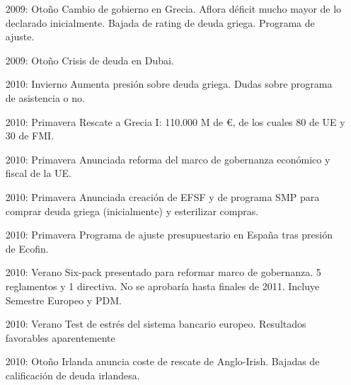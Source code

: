 \documentclass{nuevotema}
\begin{document}
\begin{itemize}
	\item[2009: Otoño] Cambio de gobierno en Grecia. Aflora déficit mucho mayor de lo declarado inicialmente. Bajada de rating de deuda griega. Programa de ajuste.
	\item[2009: Otoño] Crisis de deuda en Dubai.
	\item[2010: Invierno] Aumenta presión sobre deuda griega. Dudas sobre programa de asistencia o no.
	\item[2010: Primavera] Rescate a Grecia I: 110.000 M de €, de los cuales 80 de UE y 30 de FMI.
	\item[2010: Primavera] Anunciada reforma del marco de gobernanza económico y fiscal de la UE.
	\item[2010: Primavera] Anunciada creación de EFSF y de programa SMP para comprar deuda griega (inicialmente) y esterilizar compras.
	\item[2010: Primavera] Programa de ajuste presupuestario en España tras presión de Ecofin. 
	\item[2010: Verano] Six-pack presentado para reformar marco de gobernanza. 5 reglamentos y 1 directiva. No se aprobaría hasta finales de 2011. Incluye Semestre Europeo y PDM.
	\item[2010: Verano] Test de estrés del sistema bancario europeo. Resultados favorables aparentemente
	\item[2010: Otoño] Irlanda anuncia coste de rescate de Anglo-Irish. Bajadas de calificación de deuda irlandesa.


\end{itemize}
\end{document}
